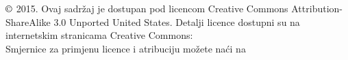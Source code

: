 \chapter*{}
\vfill


\noindent $\copyright$ 2015. Ovaj sadržaj je dostupan pod licencom Creative Commons Attribution-ShareAlike 3.0 Unported United States. Detalji licence dostupni su na internetskim stranicama Creative Commons:  \\

\noindent Smjernice za primjenu licence i atribuciju možete naći na 
